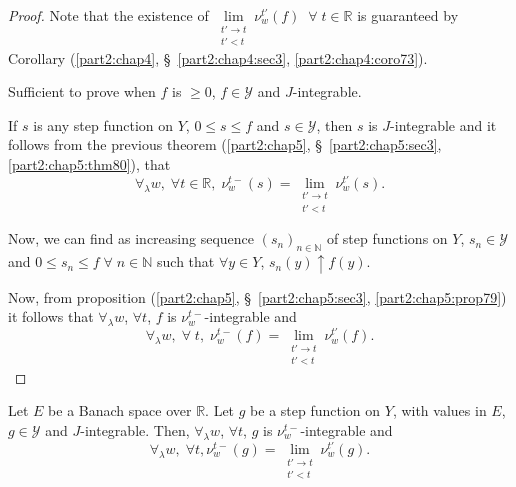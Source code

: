 \begin{proof}
Note that the existence of $\lim\limits_{\substack{t' \to t\\t'<t}}
\nu^{t'}_w(f) \;\; \forall \; t\in \mathbb{R}$ is guaranteed by Corollary
(\ref{part2:chap4}, \S\ \ref{part2:chap4:sec3}, \ref{part2:chap4:coro73}). 

Sufficient to prove when $f$ is $\geq 0 $, $f \in \mathscr{Y}$ and
$J$-integrable. 

If $s$ is any step function on $Y$, $0 \leq s \leq f$ and $s \in
\mathscr{Y}$, then $s$ is $J$-integrable and it follows from the
previous theorem (\ref{part2:chap5}, \S\ \ref{part2:chap5:sec3},
\ref{part2:chap5:thm80}), that  
$$
\forall_\lambda w, \; \forall t \in \mathbb{R}, \; \nu^{t-}_w(s) =
\lim\limits_{\substack{t'\to t\\t'<t}} \nu^{t'}_w(s).
$$

Now, we can find as increasing sequence $(s_n)_{n \in \mathbb{N}}$ of
step functions on $Y$, $s_n \in \mathscr{Y}$ and $0 \leq s_n \leq f \;
\forall \; n \in \mathbb{N}$ such that $\forall y \in Y$, $s_n (y)
\uparrow f(y)$. 

Now, from proposition (\ref{part2:chap5}, \S\ \ref{part2:chap5:sec3},
\ref{part2:chap5:prop79}) it follows that $\forall_\lambda 
w$, $\forall t$, $f$ is $\nu^{t-}_w$-integrable and 
$$
\forall_\lambda w, \; \forall \; t, \; \nu^{t-}_w(f) =
\lim\limits_{\substack{t'\to t\\ t'<t}} \nu^{t'}_w(f). 
$$
\end{proof}

\begin{proposition}\label{part2:chap5:prop82}
Let $E$ be a Banach space over $\mathbb{R}$. Let $g$ be a step
function on $Y$, with values in $E$, $g \in \mathscr{Y}$ and
$J$-integrable. Then, $\forall_\lambda w$, $\forall t$, $g$ is
$\nu^{t-}_w$-integrable and 
$$
\forall_\lambda w, \; \forall t, \nu^{t-}_w(g) =
\lim\limits_{\substack{t'\to t\\t'<t}} \nu^{t'}_w(g). 
$$
\end{proposition}

